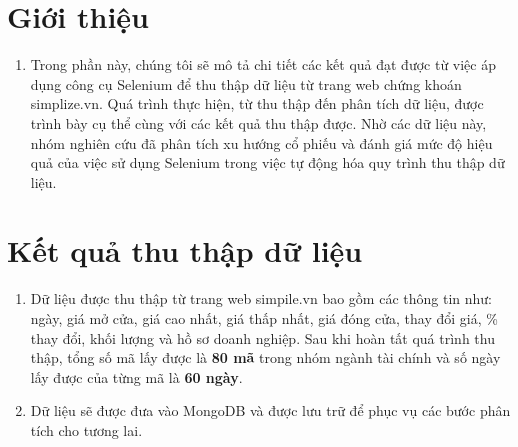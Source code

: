 \section{Giới thiệu}
\begin{enumerate}
    \item []\hspace*{0.7cm}Trong phần này, chúng tôi sẽ mô tả chi tiết các kết quả đạt được từ việc áp dụng công cụ Selenium để thu thập dữ liệu từ trang web chứng khoán simplize.vn. Quá trình thực hiện, từ thu thập đến phân tích dữ liệu, được trình bày cụ thể cùng với các kết quả thu thập được. Nhờ các dữ liệu này, nhóm nghiên cứu đã phân tích xu hướng cổ phiếu và đánh giá mức độ hiệu quả của việc sử dụng Selenium trong việc tự động hóa quy trình thu thập dữ liệu.
\end{enumerate}

\section{Kết quả thu thập dữ liệu}
\begin{enumerate}
    \item []\hspace*{0.7cm}Dữ liệu được thu thập từ trang web simpile.vn bao gồm các thông tin như: ngày, giá mở cửa, giá cao nhất, giá thấp nhất, giá đóng cửa, thay đổi giá, \% thay đổi, khối lượng và hồ sơ doanh nghiệp. Sau khi hoàn tất quá trình thu thập, tổng số mã lấy được là \textbf{80 mã} trong nhóm ngành tài chính và số ngày lấy được của từng mã là \textbf{60 ngày}.
    
    \item []\hspace*{0.7cm}Dữ liệu sẽ được đưa vào MongoDB và được lưu trữ để phục vụ các bước phân tích cho tương lai.

    
\end{enumerate}
